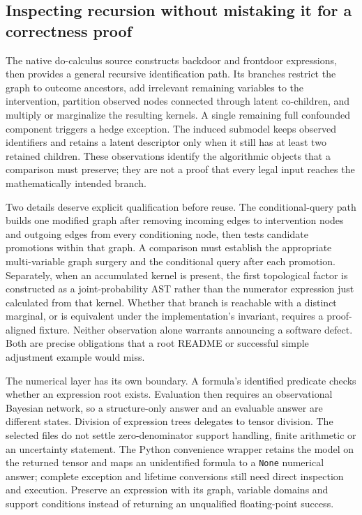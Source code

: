 \subsection{Inspecting recursion without mistaking it for a correctness proof}
\label{exec19:cxxid-recursion}
The native do-calculus source constructs backdoor and frontdoor expressions,
then provides a general recursive identification path. Its branches restrict
the graph to outcome ancestors, add irrelevant remaining variables to the
intervention, partition observed nodes connected through latent co-children,
and multiply or marginalize the resulting kernels. A single remaining full
confounded component triggers a hedge exception. The induced submodel keeps
observed identifiers and retains a latent descriptor only when it still has at
least two retained children. These observations identify the algorithmic
objects that a comparison must preserve; they are not a proof that every legal
input reaches the mathematically intended branch.
\citep{exec19_cxx_identification_source}

Two details deserve explicit qualification before reuse. The conditional-query
path builds one modified graph after removing incoming edges to intervention
nodes and outgoing edges from every conditioning node, then tests candidate
promotions within that graph. A comparison must establish the appropriate
multi-variable graph surgery and the conditional query after each promotion.
Separately, when an accumulated kernel is present, the first topological
factor is constructed as a joint-probability AST rather than the numerator
expression just calculated from that kernel. Whether that branch is reachable
with a distinct marginal, or is equivalent under the implementation's invariant,
requires a proof-aligned fixture. Neither observation alone warrants announcing
a software defect. Both are precise obligations that a root README or successful
simple adjustment example would miss.
\citep{exec19_cxx_identification_source}

The numerical layer has its own boundary. A formula's identified predicate
checks whether an expression root exists. Evaluation then requires an
observational Bayesian network, so a structure-only answer and an evaluable
answer are different states. Division of expression trees delegates to tensor
division. The selected files do not settle zero-denominator support handling,
finite arithmetic or an uncertainty statement. The Python convenience wrapper
retains the model on the returned tensor and maps an unidentified formula to a
\texttt{None} numerical answer; complete exception and lifetime conversions
still need direct inspection and execution. Preserve an expression with its
graph, variable domains and support conditions instead of returning an
unqualified floating-point success.
\citep{exec19_cxx_identification_source}

